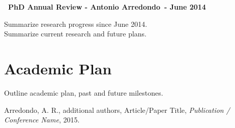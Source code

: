 \documentclass[11pt,letterpaper]{article}
\newcommand{\StudentName}{Antonio Arredondo}
\newcommand{\PubStudentName}{Arredondo, A. R.}
\newcommand{\FromMonthYear}{June 2014}
\begin{document}
\begin{center}
  \LARGE{\textbf{\the\year\ PhD Annual Review - \StudentName\ - \FromMonthYear}}
\end{center}

\noindent Summarize research progress since \FromMonthYear.
\\

\noindent Summarize current research and future plans.

\section*{Academic Plan}

Outline academic plan, past and future milestones.

\begin{thebibliography}{9}

  \PubStudentName, additional authors,
  Article/Paper Title,
  \emph{Publication / Conference Name},
  2015.

\end{thebibliography}
\end{document}
